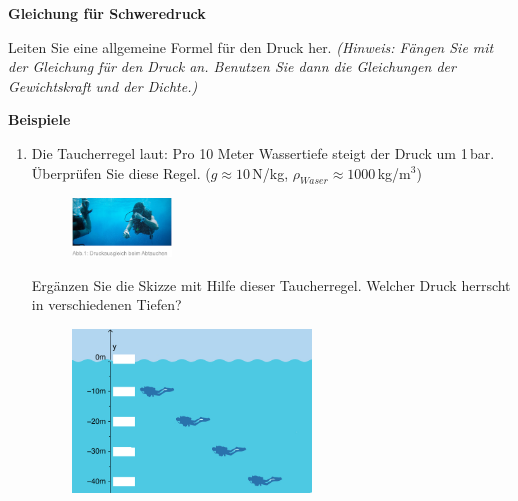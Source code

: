 \documentclass[11pt]{article}
\begin{document}
\newpage
\textbf{Gleichung für Schweredruck}

Leiten Sie eine allgemeine Formel für den Druck her. \textit{(Hinweis: Fängen Sie mit der Gleichung für den Druck an. Benutzen Sie dann die Gleichungen der Gewichtskraft und der Dichte.)}

\vspace{7cm}

\textbf{Beispiele}
\vspace{-0.3cm}


\begin{enumerate}

    \item Die Taucherregel laut: Pro 10 Meter Wassertiefe steigt der Druck um 1\,bar. Überprüfen Sie diese Regel. ($g \approx 10\,$N/kg, $\rho_{Waser} \approx 1000\,$kg/m$^3$) 

    \begin{figure}[h!]
    \begin{flushright}
        \includegraphics[width=0.25\textwidth]{images/Taucherregel.jpg}
        \label{fig:Taucher}        
    \end{flushright}
    \end{figure}
    
    \vspace{-1cm}

    Ergänzen Sie die Skizze mit Hilfe dieser Taucherregel. Welcher Druck herrscht in verschiedenen Tiefen?

    \vspace{0.3cm}

    \begin{figure}[h!]
    \begin{flushright}
        \includegraphics[width=0.6\textwidth]{images/Meer_Tiefe.jpg}
        \label{fig:regel}        
    \end{flushright}
    \end{figure}


\end{enumerate}
\end{document}
